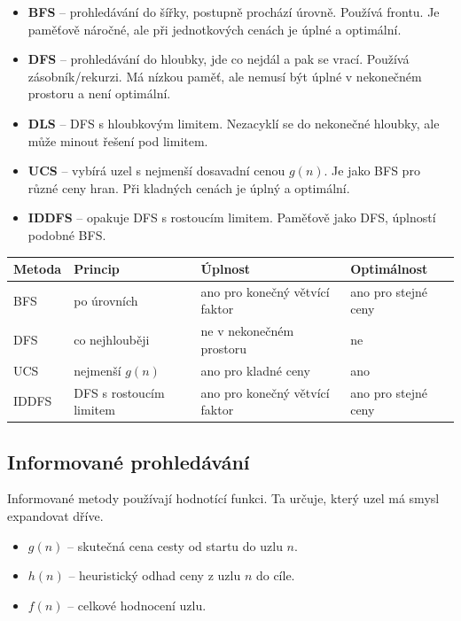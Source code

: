 \begin{itemize}
    \item \textbf{BFS} -- prohledávání do šířky, postupně prochází úrovně. Používá frontu. Je paměťově náročné, ale při jednotkových cenách je úplné a optimální.
    \item \textbf{DFS} -- prohledávání do hloubky, jde co nejdál a pak se vrací. Používá zásobník/rekurzi. Má nízkou paměť, ale nemusí být úplné v nekonečném prostoru a není optimální.
    \item \textbf{DLS} -- DFS s hloubkovým limitem. Nezacyklí se do nekonečné hloubky, ale může minout řešení pod limitem.
    \item \textbf{UCS} -- vybírá uzel s nejmenší dosavadní cenou \(g(n)\). Je jako BFS pro různé ceny hran. Při kladných cenách je úplný a optimální.
    \item \textbf{IDDFS} -- opakuje DFS s rostoucím limitem. Paměťově jako DFS, úplností podobné BFS.
\end{itemize}

\begin{center}
    \begin{tabularx}{\textwidth}{|l|X|X|X|}
        \hline
        \textbf{Metoda} & \textbf{Princip}        & \textbf{Úplnost}               & \textbf{Optimálnost} \\
        \hline
        BFS             & po úrovních             & ano pro konečný větvící faktor & ano pro stejné ceny  \\
        \hline
        DFS             & co nejhlouběji          & ne v nekonečném prostoru       & ne                   \\
        \hline
        UCS             & nejmenší \(g(n)\)       & ano pro kladné ceny            & ano                  \\
        \hline
        IDDFS           & DFS s rostoucím limitem & ano pro konečný větvící faktor & ano pro stejné ceny  \\
        \hline
    \end{tabularx}
\end{center}

\subsection*{Informované prohledávání}
Informované metody používají hodnotící funkci. Ta určuje, který uzel má smysl
expandovat dříve.

\begin{itemize}
    \item \(g(n)\) -- skutečná cena cesty od startu do uzlu \(n\).
    \item \(h(n)\) -- heuristický odhad ceny z uzlu \(n\) do cíle.
    \item \(f(n)\) -- celkové hodnocení uzlu.
\end{itemize}

